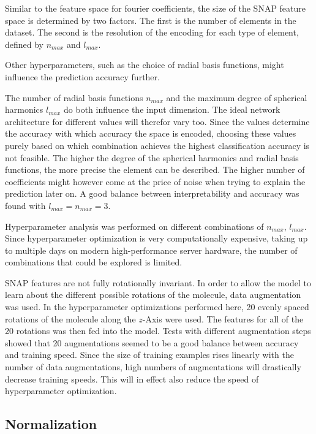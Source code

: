 Similar to the feature space for fourier coefficients, the size of the SNAP feature space is determined by two factors.
The first is the number of elements in the dataset.
The second is the resolution of the encoding for each type of element, defined by $n_{max}$ and $l_{max}$.

Other hyperparameters, such as the choice of radial basis functions, might influence the prediction accuracy further.

The number of radial basis functions $n_{max}$ and the maximum degree of spherical harmonics $l_{max}$ do both influence
the input dimension.
The ideal network architecture for different values will therefor vary too.
Since the values determine the accuracy with which accuracy the space is encoded, choosing these values purely 
based on which combination achieves the highest classification accuracy is not feasible.
The higher the degree of the spherical harmonics and radial basis functions, the more precise the element can be described.
The higher number of coefficients might however come at the price of noise when trying to explain the prediction later on.
A good balance between interpretability and accuracy was found with $l_{max}=n_{max}=3$. %

Hyperparameter analysis was performed on different combinations of $n_{max}$, $l_{max}$.
Since hyperparameter optimization is very computationally expensive, taking up to multiple days on modern high-performance 
server hardware, the number of combinations that could be explored is limited.

SNAP features are not fully rotationally invariant.
In order to allow the model to learn about the different possible rotations of the molecule, data augmentation was used.
In the hyperparameter optimizations performed here, 20 evenly spaced rotations of the molecule along the $z$-Axis were used.
The features for all of the 20 rotations was then fed into the model.
Tests with different augmentation steps showed that 20 augmentations seemed to be a good balance between 
accuracy and training speed.
Since the size of training examples rises linearly with the number of data augmentations,
high numbers of augmentations will drastically decrease training speeds.
This will in effect also reduce the speed of hyperparameter optimization.

\subsection{Normalization}

